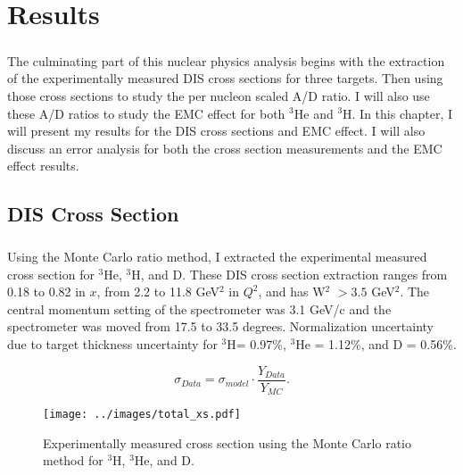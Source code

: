 
\chapter{Results}
\paragraph{}The culminating part of this nuclear physics analysis begins with the extraction of the experimentally measured DIS cross sections for three targets. Then using those cross sections to study the per nucleon scaled A/D ratio. I will also use these A/D ratios to study the EMC effect for both $^3$He and $^3$H. In this chapter, I will present my results for the DIS cross sections and EMC effect. I will also discuss an error analysis for both the cross section measurements and the EMC effect results. 
\section{DIS Cross Section}
\paragraph{}Using the Monte Carlo ratio method, I extracted the experimental measured cross section for $^3$He, $^3$H, and D. These DIS cross section extraction ranges from 0.18 to 0.82 in $x$, from 2.2 to 11.8 GeV$^2$ in $Q^2$, and has W$^2$ $>3.5$ GeV$^2$. The central momentum setting of the spectrometer was 3.1 GeV/c and the spectrometer was moved from 17.5 to 33.5 degrees. Normalization uncertainty due to target thickness uncertainty for $^3$H= 0.97\%, $^3$He = 1.12\%, and D = 0.56\%.


\begin{equation}
\sigma_{Data} = \sigma_{model} \cdot \frac{Y_{Data}}{Y_{MC}}. 
\end{equation}

\begin{figure}[t]
	\centering
	\texttt{[image: ../images/total\_xs.pdf]}
	\caption{Experimentally measured cross section using the Monte Carlo ratio method for $^3$H, $^3$He, and D. }
    \label{CCplot}
\end{figure}

